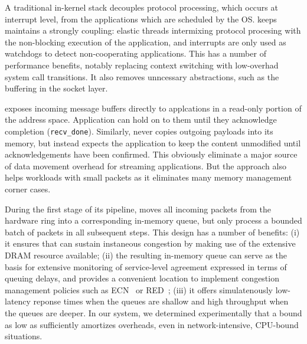 A traditional in-kernel stack decouples protocol processing, which
occurs at interrupt level, from the applications which are scheduled
by the OS.  \ix keeps maintains a strongly coupling: elastic threads
intermixing protocol procesing with the non-blocking execution of the
application, and interrupts are only used as watchdogs to detect
non-cooperating applications.  This has a number of performance
benefits, notably replacing context switching with low-overhad system
call transitions.  It also removes unncessary abstractions, such as
the buffering in the socket layer.

 \ix exposes incoming message buffers directly
to applcations in a read-only portion of the address
space. Application can hold on to them until they acknowledge completion (\texttt{recv\_done}).
Similarly, \ix never copies outgoing payloads into its memory, but
instead expects the application to keep the content unmodified until
acknowledgements have been confirmed.  This obviously eliminate a
major source of data movement overhead for streaming applications.
But the approach also helps workloads with small packets as it
eliminates many memory management corner cases.

 During the first stage of
its pipeline, \ix moves all incoming packets from the hardware ring
into a corresponding in-memory queue, but only process a bounded batch
of packets in all subsequent steps.  This design has a number of
benefits: (i) it ensures that \ix can sustain instaneous congestion by
making use of the extensive DRAM resource available; (ii) the
resulting in-memory queue can serve as the basis for extensive
monitoring of service-level agreement expressed in terms of queuing
delays, and provides a convenient location to implement congestion
management policies such as ECN~\cite{ramakrishnan2001addition} or
RED~\cite{DBLP:journals/ton/FloydJ93}; (iii) it offers simulatenously
low-latency reponse times when the queues are shallow and high
throughput when the queues are deeper.  In our system, we determined
experimentally that a bound as low as  sufficiently
amortizes overheads, even in network-intensive, CPU-bound situations.

